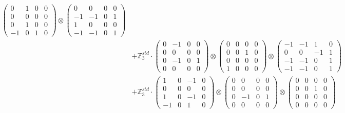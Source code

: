 \documentclass{article}
\begin{document}
{\begin{align}
            \begin{pmatrix} 0 & 1 & 0 & 0 \\ 0 & 0 & 0 & 0 \\ 0 & 1 & 0 & 0 \\ -1 & 0 & 1 & 0 \end{pmatrix} \otimes 
            \begin{pmatrix} 0 & 0 & 0 & 0 \\ -1 & -1 & 0 & 1 \\ 1 & 0 & 0 & 0 \\ -1 & -1 & 0 & 1 \end{pmatrix} \\ 
        &+ \label{Rs16-Rc11-Solution-24-c20} \mathbb{Z}_3^{std} \cdot 
            \begin{pmatrix} 0 & -1 & 0 & 0 \\ 0 & 0 & 0 & 0 \\ 0 & -1 & 0 & 1 \\ 0 & 0 & 0 & 0 \end{pmatrix} \otimes 
            \begin{pmatrix} 0 & 0 & 0 & 0 \\ 0 & 0 & 1 & 0 \\ 0 & 0 & 0 & 0 \\ 1 & 0 & 0 & 0 \end{pmatrix} \otimes 
            \begin{pmatrix} -1 & -1 & 1 & 0 \\ 0 & 0 & -1 & 1 \\ -1 & -1 & 0 & 1 \\ -1 & -1 & 0 & 1 \end{pmatrix} \\ 
        &+ \label{Rs16-Rc11-Solution-24-c21} \mathbb{Z}_3^{std} \cdot 
            \begin{pmatrix} 1 & 0 & -1 & 0 \\ 0 & 0 & 0 & 0 \\ 1 & 0 & -1 & 0 \\ -1 & 0 & 1 & 0 \end{pmatrix} \otimes 
            \begin{pmatrix} 0 & 0 & 0 & 0 \\ 0 & 0 & 0 & 0 \\ 0 & -1 & 0 & 1 \\ 0 & 0 & 0 & 0 \end{pmatrix} \otimes 
            \begin{pmatrix} 0 & 0 & 0 & 0 \\ 0 & 0 & 1 & 0 \\ 0 & 0 & 0 & 0 \\ 0 & 0 & 0 & 0 \end{pmatrix} \\ 

\end{align}}
\end{document}
